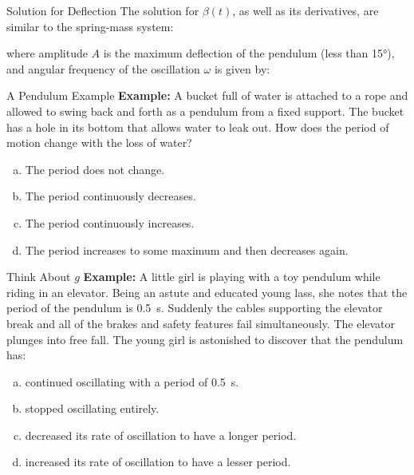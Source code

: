\documentclass[12pt,compress,aspectratio=169]{beamer}
\newcommand{\eq}[2]{\vspace{#1}{\Large\begin{displaymath}#2\end{displaymath}}}
\begin{document}
\begin{frame}{Solution for Deflection}
  The solution for $\beta(t)$, as well as its derivatives, are similar to the
  spring-mass system:

  \eq{-.2in}{
    \boxed{\beta(t)=A\cos(\omega t-\phi) +B}
  }
    
  where amplitude $A$ is the maximum deflection of the pendulum (less than
  \ang{15}), and angular frequency of the oscillation $\omega$ is given by:
  
  \eq{-.15in}{
    \boxed{\omega=\sqrt{\frac{g}{L}}}
  }
\end{frame}



\begin{frame}{A Pendulum Example}
  \textbf{Example:} A bucket full of water is attached to a rope and allowed
  to swing back and forth as a pendulum from a fixed support. The bucket has a
  hole in its bottom that allows water to leak out. How does the period of
  motion change with the loss of water?
  \begin{enumerate}[(a)]
  \item The period does not change.
  \item The period continuously decreases.
  \item The period continuously increases.
  \item The period increases to some maximum and then decreases again.
  \end{enumerate}
\end{frame}


\begin{frame}{Think About $g$}
  \textbf{Example:} A little girl is playing with a toy pendulum while riding
  in an elevator. Being an astute and educated young lass, she notes that the 
  period of the pendulum is \SI{.5}{\second}. Suddenly the cables
  supporting the elevator break and all  of the brakes and safety features fail
  simultaneously. The elevator plunges into free fall. The young girl is
  astonished to discover that the pendulum has:
  \begin{enumerate}[(a)]
  \item continued oscillating with a period of \SI{.5}{\second}.
  \item stopped oscillating entirely.
  \item decreased its rate of oscillation to have a longer period.
  \item increased its rate of oscillation to have a lesser period.
  \end{enumerate}
\end{frame}
\end{document}
